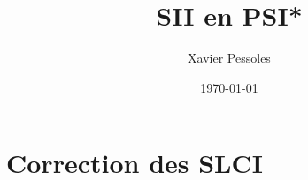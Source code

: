 \documentclass[
	fontsize=10pt, %
	twoside=true, %
]{kaobook}
\newcommand{\repRel}{../../..}
\newcommand{\repStyle}{\repRel/Style}
\begin{document}

\titlehead{Correction des SLCI}
\title[SII en PSI*]{SII en PSI*}
\author[XP]{Xavier Pessoles}
\date{\today}

%
\frontmatter %
%

%

%
\mainmatter %



\setcounter{margintocdepth}{\sectiontocdepth}
\marginlayout
\graphicspath{{\repStyle/png}}

\pagestyle{xp.scrheadings}


%



\newcommand{\repExo}{Application_01_ROV}
\newcommand{\nomExo}{Application_01_ROV}

\livrettrue %
\collefalse


\setcounter{chapter}{12}

\setchapterpreamble[u]{\margintoc}
\chapter{Correction des SLCI}

\normaltrue

\end{document}
